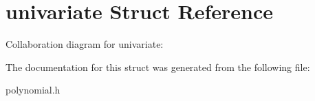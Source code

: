 \hypertarget{structunivariate}{\section{univariate Struct Reference}
\label{structunivariate}
}


Collaboration diagram for univariate\-:


The documentation for this struct was generated from the following file\-:\begin{DoxyCompactItemize}
\item 
polynomial.\-h\end{DoxyCompactItemize}
